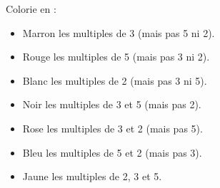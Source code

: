 \begin{minipage}{0.45\textwidth}
    
\end{minipage}
\hfil
\begin{minipage}{0.45\textwidth}
    Colorie en :
    \begin{itemize}[leftmargin=0.7cm]
        \item Marron les multiples de 3 (mais pas 5 ni 2).
        \item Rouge les multiples de 5 (mais pas 3 ni 2).
        \item Blanc les multiples de 2 (mais pas 3 ni 5).
        \item Noir les multiples de 3 et 5 (mais pas 2).
        \item Rose les multiples de 3 et 2 (mais pas 5).
        \item Bleu les multiples de 5 et 2 (mais pas 3).
        \item Jaune les multiples de 2, 3 et 5.
    \end{itemize}
\end{minipage}
